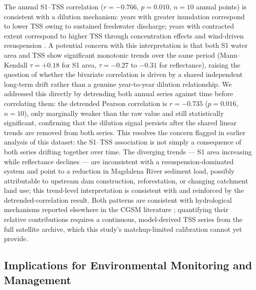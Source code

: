 \documentclass[remotesensing,article,submit,pdftex,moreauthors]{Definitions/mdpi}
\begin{document}
The annual S1--TSS correlation ($r = -0.766$, $p = 0.010$, $n = 10$
annual points) is consistent with a dilution mechanism: years with
greater inundation correspond to lower TSS owing to sustained
freshwater discharge; years with contracted extent correspond to
higher TSS through concentration effects and wind-driven resuspension
\citep{Blanco2006}. A potential concern with this interpretation is
that both S1 water area and TSS show significant monotonic trends over
the same period (Mann--Kendall $\tau = +0.18$ for S1 area, $\tau = -0.27$
to $-0.31$ for reflectance), raising the question of whether the
bivariate correlation is driven by a shared independent long-term drift
rather than a genuine year-to-year dilution relationship. We addressed
this directly by detrending both annual series against time before
correlating them: the detrended Pearson correlation is $r = -0.735$
($p = 0.016$, $n = 10$), only marginally weaker than the raw value and
still statistically significant, confirming that the dilution signal
persists after the shared linear trends are removed from both series.
This resolves the concern flagged in earlier analysis of this dataset:
the S1--TSS association is not simply a consequence of both series
drifting together over time. The diverging trends --- S1 area increasing
while reflectance declines --- are inconsistent with a
resuspension-dominated system and point to a reduction in Magdalena
River sediment load, possibly attributable to upstream dam construction,
reforestation, or changing catchment land use; this trend-level
interpretation is consistent with and reinforced by the
detrended-correlation result. Both patterns are
consistent with hydrological mechanisms reported elsewhere in the CGSM
literature \citep{Blanco2006,Jaramillo2018}; quantifying their relative
contributions requires a continuous, model-derived TSS series from the
full satellite archive, which this study's matchup-limited calibration
cannot yet provide.
 
 
\subsection{Implications for Environmental Monitoring and Management}
\label{sec:disc_management}
 
\end{document}
